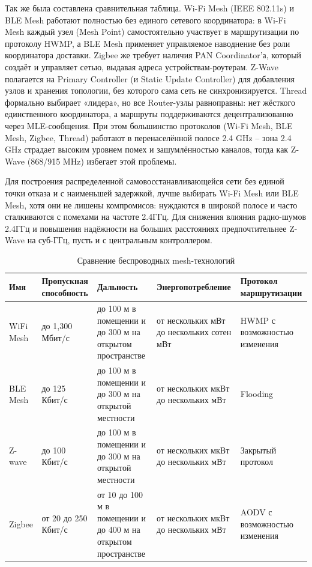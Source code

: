 \documentclass[a4paper,12pt]{article}
\begin{document}
Так же была составлена сравнительная таблица.
Wi-Fi Mesh (IEEE 802.11s) и BLE Mesh работают полностью без единого сетевого координатора: в Wi-Fi Mesh каждый узел (Mesh Point) самостоятельно участвует в маршрутизации
по протоколу HWMP, а BLE Mesh применяет управляемое наводнение без роли координатора доставки. Zigbee же требует наличия PAN Coordinator’а, который создаёт и управляет
сетью, выдавая адреса устройствам-роутерам. Z-Wave полагается на Primary Controller (и Static Update Controller) для добавления узлов и хранения
топологии, без которого сама сеть не синхронизируется. Thread формально выбирает «лидера», но все Router-узлы равноправны: нет жёсткого единственного
координатора, а маршруты поддерживаются децентрализованно через MLE-сообщения. При этом большинство протоколов (Wi-Fi Mesh, BLE Mesh, Zigbee, Thread) работают в перенаселённой
полосе 2.4 GHz – зона 2.4 GHz страдает высоким уровнем помех и зашумлённостью каналов, тогда как Z-Wave (868/915 MHz) избегает этой проблемы.

Для построения распределенной самовосстанавливающейся сети без единой точки отказа и с наименьшей задержкой, лучше выбирать Wi-Fi Mesh или BLE Mesh, хотя они не лишены
компромисов: нуждаются в широкой полосе и часто сталкиваются с помехами на частоте 2.4ГГц. Для снижения влияния радио-шумов 2.4ГГц и повышения надёжности на больших
расстояниях предпочтительнее Z-Wave на суб-ГГц, пусть и с центральным контроллером.

\begin{table}[h!]
    \centering
    \renewcommand{\arraystretch}{1.3}
    \begin{tabularx}{\textwidth}{|l|X|X|X|X|}
        \hline
        \textbf{Имя} & \textbf{Пропускная способность} & \textbf{Дальность} & \textbf{Энергопотребление} & \textbf{Протокол маршрутизации} \\
        \hline
        WiFi Mesh & до 1,300 Мбит/с & до 100 м в помещении и до 300 м на открытом пространстве & от нескольких мВт до нескольких сотен мВт & HWMP с возможностью изменения \\
        \hline
        BLE Mesh & до 125 Кбит/с & до 100 м в помещении и до 300 м на открытой местности & от нескольких мкВт до нескольких мВт & Flooding \\
        \hline
        Z-wave & до 100 Кбит/с & до 100 м в помещении и до 300 м на открытой местности & от нескольких мкВт до нескольких мВт & Закрытый протокол \\
        \hline
        Zigbee & от 20 до 250 Кбит/с & от 10 до 100 м в помещении и до 400 м на открытом пространстве & от нескольких мкВт до нескольких мВт & AODV с возможностью изменения \\
        \hline
    \end{tabularx}
    \caption{Сравнение беспроводных mesh-технологий}
\end{table}
\end{document}
